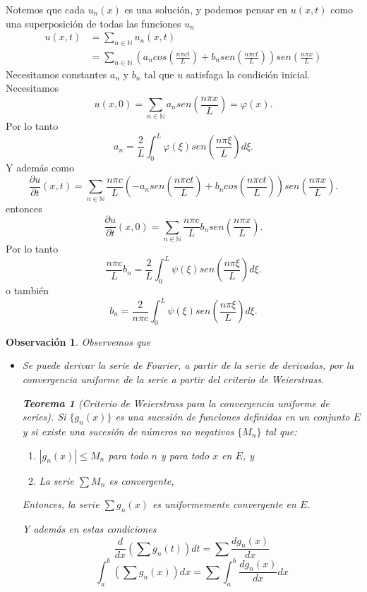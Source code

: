 \documentclass[11pt]{book}
\theoremstyle{plain}
\newtheorem{teo}[proposición]{Teorema}
\newtheorem{obs}[proposición]{Observación}
\theoremstyle{definition}
\newcommand{\N}{\mathbb{N}}
\begin{document}
Notemos que cada $u_n(x)$ es una solución, y podemos pensar en $u(x,t)$ como una superposición de todas las funciones $u_n$
\begin{align*}
    u(x,t) &= \sum_{n\in\N} u_{n}(x,t)\\
    &= \sum_{n\in\N} \left(a_{n}cos\left(\frac{n\pi ct}{L}\right) + b_{n}sen\left(\frac{n\pi ct}{L}\right)\right)sen(\frac{n\pi x}{L})
\end{align*}
Necesitamos constantes $a_{n}$ y $b_{n}$ tal que $u$ satisfaga la condición inicial. Necesitamos 
\[
u(x,0) = \sum_{n\in\N} a_{n}sen(\frac{n\pi x}{L}) = \varphi(x)
.\]
Por lo tanto
\[
a_{n} = \frac{2}{L}\int_{0}^{L} \varphi(\xi)sen(\frac{n\pi \xi}{L})d\xi
.\]
Y además como
\[
\frac{\partial u}{\partial t}(x,t) = \sum_{n\in\N} \frac{n\pi c}{L}\left(-a_{n}sen\left(\frac{n\pi ct}{L}\right) + b_{n}cos\left(\frac{n\pi ct}{L}\right)\right)sen(\frac{n\pi x}{L})
.\]
entonces
\[
\frac{\partial u}{\partial t}(x,0) = \sum_{n\in\N} \frac{n\pi c}{L}b_{n}sen(\frac{n\pi x}{L})
.\]
Por lo tanto
\[
\frac{n\pi c}{L}b_{n} = \frac{2}{L}\int_{0}^{L} \psi(\xi)sen(\frac{n\pi \xi}{L})d\xi
.\]
o también
\[
b_{n} = \frac{2}{n\pi c}\int_{0}^{L} \psi(\xi)sen(\frac{n\pi \xi}{L})d\xi
.\]

\begin{obs}
Observemos que
    \begin{itemize}
        \item Se puede derivar la serie de Fourier, a partir de la serie de derivadas, por la convergencia uniforme de la serie a partir del criterio de Weierstrass.
        \begin{teo}[Criterio de Weierstrass para la convergencia uniforme de series]
            Si \(\{ g_n(x) \}\) es una sucesión de funciones definidas en un conjunto \( E \) y si existe una sucesión de números no negativos \(\{ M_n \}\) tal que:
                \begin{enumerate}
                    \item \( |g_n(x)| \leq M_n \) para todo \( n \) y para todo \( x \) en \( E \), y
                    \item La serie \( \sum M_n \) es convergente,
                \end{enumerate}
                Entonces, la serie \( \sum g_n(x) \) es uniformemente convergente en \( E \). 
        \end{teo}
        Y además en estas condiciones
                \[ \frac{d}{dx}\left( \sum g_n(t) \right) dt = \sum \frac{d g_n(x)}{dx} \]
                \[ \int_a^b \left( \sum g_n(x) \right) dx = \sum \int_a^b \frac{d g_n(x)}{dx} dx \]
    \end{itemize}
\end{obs}
\end{document}
